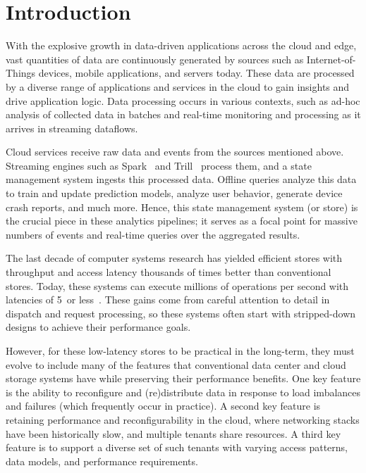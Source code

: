 \chapter{Introduction}

With the explosive growth in data-driven applications across the cloud
and edge, vast quantities of data are continuously generated by sources
such as Internet-of-Things devices, mobile applications, and servers
today.
%
These data are processed by a diverse range of applications and
services in the cloud to gain insights and drive application logic.
%
Data
processing occurs in various contexts, such as ad-hoc analysis of
collected data in batches and real-time monitoring and processing as it
arrives in streaming dataflows.

Cloud services receive raw data and events from the sources mentioned
above.
%
Streaming engines such as Spark~\cite{spark} and Trill~\cite{trill} process
them, and a state management system ingests this processed data.
%
Offline
queries analyze this data to train and update prediction models, analyze
user behavior, generate device crash reports, and much more.
%
Hence, this
state management system (or store) is the crucial piece in these
analytics pipelines; it serves as a focal point for massive numbers of
events and real-time queries over the aggregated results.

The last decade of computer systems research has yielded efficient
stores with throughput and access latency thousands
of times better than conventional stores.
%
Today,
these systems can execute millions of operations per second
with latencies
of 5~\us or less~\cite{mica,ramcloud,farm-2014}.
%
%
These gains come from careful attention to detail in dispatch and
request processing,
so these systems often start with stripped-down designs to
achieve their performance goals.

However, for these low-latency stores to be practical in the long-term,
they must evolve to include many of the features that conventional data
center and cloud storage systems have while preserving their performance
benefits.
%
One key feature is the ability to reconfigure and
(re)distribute data in response to load imbalances and failures (which
frequently occur in practice).
%
A second key feature is retaining
performance and reconfigurability in the cloud, where networking stacks
have been historically slow, and multiple tenants share resources.
%
A third key feature is to support a diverse set of such tenants with
varying access patterns, data models, and performance requirements.

